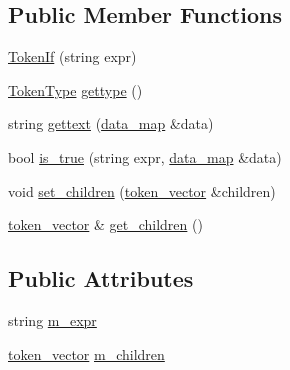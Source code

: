 \subsection*{Public Member Functions}
\begin{DoxyCompactItemize}
\item 
\hyperlink{classxtd_1_1network_1_1http_1_1cpptempl_1_1TokenIf_a85507707011ac1fadff757c738600fa8}{Token\+If} (string expr)
\item 
\hyperlink{namespacextd_1_1network_1_1http_1_1cpptempl_a39833083d228a5b5ef9f6bb7896479ee}{Token\+Type} \hyperlink{classxtd_1_1network_1_1http_1_1cpptempl_1_1TokenIf_a8f79f4e2ee4ea4eca0ff1730679a28d3}{gettype} ()
\item 
string \hyperlink{classxtd_1_1network_1_1http_1_1cpptempl_1_1TokenIf_a326aa566357136e9c331be938442176d}{gettext} (\hyperlink{namespacextd_1_1network_1_1http_1_1cpptempl_a638d1d81c8fb63c0bbafd508d6a2a007}{data\+\_\+map} \&data)
\item 
bool \hyperlink{classxtd_1_1network_1_1http_1_1cpptempl_1_1TokenIf_aa803ceac00459d9ceae20b64e4e366e7}{is\+\_\+true} (string expr, \hyperlink{namespacextd_1_1network_1_1http_1_1cpptempl_a638d1d81c8fb63c0bbafd508d6a2a007}{data\+\_\+map} \&data)
\item 
void \hyperlink{classxtd_1_1network_1_1http_1_1cpptempl_1_1TokenIf_ab88a2991518e79ec41c90372c4153210}{set\+\_\+children} (\hyperlink{namespacextd_1_1network_1_1http_1_1cpptempl_a38606cfbbfe81ed46ea9b0cf064de956}{token\+\_\+vector} \&children)
\item 
\hyperlink{namespacextd_1_1network_1_1http_1_1cpptempl_a38606cfbbfe81ed46ea9b0cf064de956}{token\+\_\+vector} \& \hyperlink{classxtd_1_1network_1_1http_1_1cpptempl_1_1TokenIf_ad289850734bbb131bfef741a80664e31}{get\+\_\+children} ()
\end{DoxyCompactItemize}
\subsection*{Public Attributes}
\begin{DoxyCompactItemize}
\item 
string \hyperlink{classxtd_1_1network_1_1http_1_1cpptempl_1_1TokenIf_a1d1181e1717358dd9e1a37387dfd5454}{m\+\_\+expr}
\item 
\hyperlink{namespacextd_1_1network_1_1http_1_1cpptempl_a38606cfbbfe81ed46ea9b0cf064de956}{token\+\_\+vector} \hyperlink{classxtd_1_1network_1_1http_1_1cpptempl_1_1TokenIf_afeb13fbde7fb87c9f6321c0c8042e25b}{m\+\_\+children}
\end{DoxyCompactItemize}


